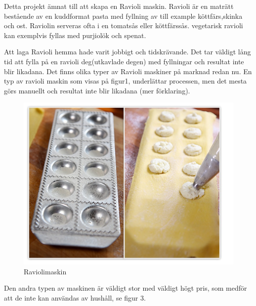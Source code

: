 Detta projekt  ämnat till att skapa en Ravioli maskin. Ravioli är en maträtt bestående av en kuddformat pasta med fyllning av till example köttfärs,skinka och ost. Raviolin serveras ofta i en tomatsås eller köttfärssås. vegetarisk ravioli kan exemplvis fyllas med purjiolök och spenat. 

Att laga Ravioli hemma hade varit jobbigt och tidskrävande. Det tar väldigt lång tid att fylla på en ravioli deg(utkavlade degen) med fyllningar och resultat inte blir likadana.
Det finns olika typer av Ravioli maskiner på marknad redan nu. En typ av ravioli maskin som visas på figur1, underlättar processen, men det mesta görs manuellt och resultat inte blir likadana (mer förklaring).\\

	 		 		\begin{figure}[h]
	 		 			\begin{center}
	 		 				\includegraphics[scale=0.5]{images/raviolimoldwithfilling.jpg}
	 		 				\caption{Raviolimaskin}
	 		 				\label{ravioli}	
	 		 			\end{center}
	 		 		\end{figure}
Den andra typen av maskinen är väldigt stor med väldigt högt pris, som medför att de inte kan användas av hushåll, se figur 3.
